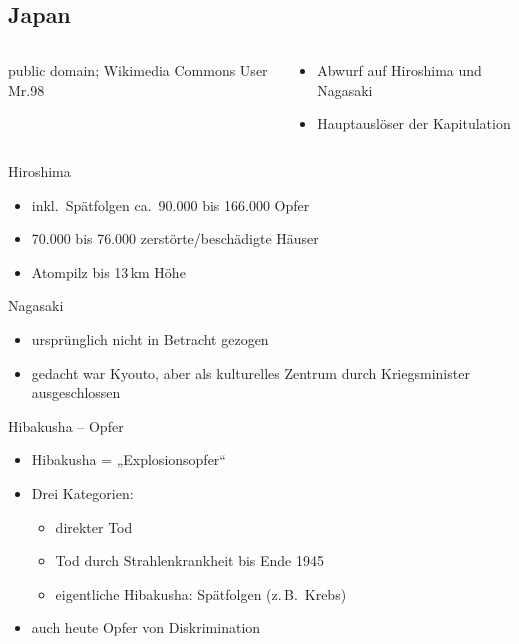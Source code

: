 \subsection{Japan}
\begin{frame}
	\begin{columns}
		\begin{column}{0.6\textwidth}
			{public domain; Wikimedia Commons User Mr.98}
		\end{column}
		\begin{column}{0.39\textwidth}
			\begin{itemize}
				\item Abwurf auf Hiroshima und Nagasaki
				\pause
				\item Hauptauslöser der Kapitulation
			\end{itemize}
		\end{column}
	\end{columns}
\end{frame}

\begin{frame}{Hiroshima}
	\begin{itemize}
		\item inkl.\ Spätfolgen ca.\ 90.000 bis 166.000 Opfer
		\pause
		\item 70.000 bis 76.000 zerstörte/beschädigte Häuser
		\pause
		\item Atompilz bis 13\,km Höhe
	\end{itemize}
\end{frame}

\begin{frame}{Nagasaki}
	\begin{itemize}
		\item ursprünglich nicht in Betracht gezogen
		\item gedacht war Kyouto, aber als kulturelles Zentrum durch
			Kriegsminister ausgeschlossen
	\end{itemize}
\end{frame}

\begin{frame}{Hibakusha -- Opfer}
	\begin{itemize}
		\item Hibakusha = „Explosionsopfer“
		\pause
		\item Drei Kategorien:
			\pause \begin{itemize}
			\item direkter Tod
			\pause
			\item Tod durch Strahlenkrankheit bis Ende 1945
			\pause
			\item eigentliche Hibakusha: Spätfolgen (z.\,B.\ Krebs)
			\pause
		\end{itemize}
		\item auch heute Opfer von Diskrimination
	\end{itemize}
\end{frame}


